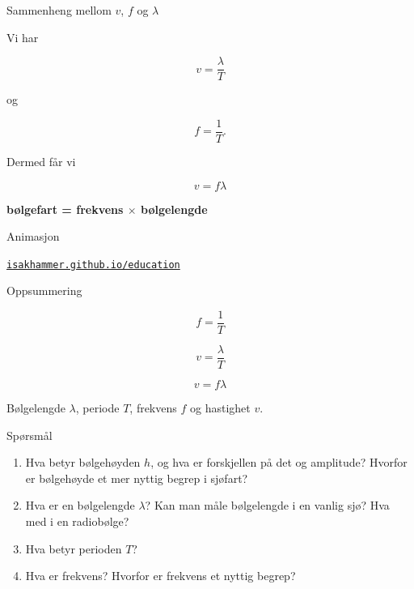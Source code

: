 \documentclass[aspectratio=119,12pt]{beamer}
\begin{document}
\begin{frame}{Sammenheng mellom \(v\), \(f\) og \(\lambda\)}

Vi har

\[
v=\frac{\lambda}{T}
\]

og

\[
f=\frac{1}{T}.
\]

Dermed får vi

\[
\boxed{v=f\lambda}
\]

\vspace{0.8cm}

\begin{center}
\Large
\textbf{ bølgefart = frekvens $\times$ bølgelengde}
\end{center}

\end{frame}


\begin{frame}{Animasjon}

\centering
\href{https://isakhammer.github.io/education/}{\texttt{isakhammer.github.io/education}}

\end{frame}


\begin{frame}{Oppsummering}

\[
\boxed{f=\frac{1}{T}}
\]

\[
\boxed{v=\frac{\lambda}{T}}
\]

\[
\boxed{v=f\lambda}
\]

\vspace{0.7cm}

\begin{center}
\Large
Bølgelengde \(\lambda\), periode \(T\), frekvens \(f\)
og hastighet \(v\).
\end{center}

\end{frame}

\begin{frame}{Spørsmål}

\begin{enumerate}
    \item Hva betyr bølgehøyden \(h\), og hva er forskjellen på det og amplitude? Hvorfor er bølgehøyde et mer nyttig begrep i sjøfart?
    \item Hva er en bølgelengde \(\lambda\)? Kan man måle bølgelengde i en vanlig sjø? Hva med i en radiobølge? 
    \item Hva betyr perioden \(T\)?
    \item Hva er frekvens? Hvorfor er frekvens et nyttig begrep? 
\end{enumerate}

\end{frame}
\end{document}

